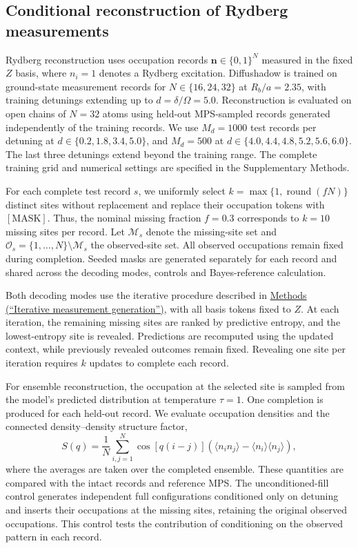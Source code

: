 \documentclass[pdflatex,sn-nature]{sn-jnl}%
\theoremstyle{thmstyleone}%
\theoremstyle{thmstyletwo}%
\theoremstyle{thmstylethree}%
\begin{document}
\subsection{Conditional reconstruction of Rydberg measurements}
\label{sec:method_rydberg}

Rydberg reconstruction uses occupation records
\(\mathbf{n}\in\{0,1\}^{N}\) measured in the fixed \(Z\) basis, where \(n_i=1\) denotes a Rydberg excitation. Diffushadow is trained on ground-state measurement records for \(N\in\{16,24,32\}\) at \(R_b/a=2.35\), with training detunings extending up to \(d=\delta/\Omega=5.0\). Reconstruction is evaluated on open chains of \(N=32\) atoms using held-out MPS-sampled records generated independently of the training records. We use \(M_d=1000\) test records per detuning at
\(d\in\{0.2,1.8,3.4,5.0\}\), and \(M_d=500\) at
\(d\in\{4.0,4.4,4.8,5.2,5.6,6.0\}\).
The last three detunings extend beyond the training range. The complete training grid and numerical settings are specified in the Supplementary Methods.

For each complete test record \(s\), we uniformly select
\(k=\max\{1,\operatorname{round}(fN)\}\) distinct sites without replacement and replace their occupation tokens with \([\mathrm{MASK}]\). Thus, the nominal missing fraction \(f=0.3\) corresponds to \(k=10\) missing sites per record. Let \(\mathcal{M}_s\) denote the missing-site set and
\(\mathcal{O}_s=\{1,\ldots,N\}\setminus\mathcal{M}_s\)
the observed-site set. All observed occupations remain fixed during completion. Seeded masks are generated separately for each record and shared across the decoding modes, controls and Bayes-reference calculation.

Both decoding modes use the iterative procedure described in \hyperref[sec:method_generation]{Methods (``Iterative measurement generation'')}, with all basis tokens fixed to \(Z\). At each iteration, the remaining missing sites are ranked by predictive entropy, and the lowest-entropy site is revealed. Predictions are recomputed using the updated context, while previously revealed outcomes remain fixed. Revealing one site per iteration requires \(k\) updates to complete each record.

For ensemble reconstruction, the occupation at the selected site is sampled from the model's predicted distribution at temperature \(\tau=1\). One completion is produced for each held-out record. We evaluate occupation densities and the connected density--density structure factor,
\begin{equation}
\label{eq:rydberg_structure_factor}
S(q)
=
\frac{1}{N}
\sum_{i,j=1}^{N}
\cos[q(i-j)]
\left(
\langle n_i n_j\rangle
-
\langle n_i\rangle\langle n_j\rangle
\right),
\end{equation}
where the averages are taken over the completed ensemble. These quantities are compared with the intact records and reference MPS. The unconditioned-fill control generates independent full configurations conditioned only on detuning and inserts their occupations at the missing sites, retaining the original observed occupations. This control tests the contribution of conditioning on the observed pattern in each record.
\end{document}
